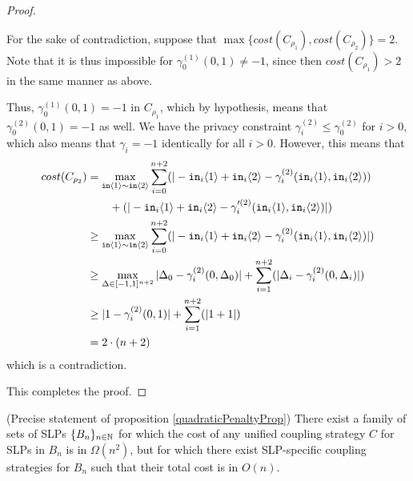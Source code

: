 \begin{proof}
\begin{itemize}
    For the sake of contradiction, suppose that $\max\{cost(C_{\rho_1}), cost(C_{\rho_2})\}=2$. Note that it is thus impossible for $\gamma_0^{(1)}(0, 1) \neq -1$, since then $cost(C_{\rho_1}) > 2$ in the same manner as above.  

    Thus, $\gamma_0^{(1)}(0, 1) = -1$ in $C_{\rho_1}$, which by hypothesis, means that $\gamma_0^{(2)}(0, 1) = -1$ as well. We have the privacy constraint $\gamma_i^{(2)} \leq \gamma_0^{(2)}$ for $i>0$, which also means that $\gamma_i = -1$ identically for all $i > 0$. However, this means that 
    \begin{align*}
        cost(C_{\rho_2}) &= \max_{\texttt{in}\langle1 \rangle\sim\texttt{in}\langle2 \rangle}\sum_{i=0}^{n+2}(|-\texttt{in}_i\langle1 \rangle+\texttt{in}_i\langle2 \rangle-\gamma_i^{(2)}(\texttt{in}_i\langle1 \rangle, \texttt{in}_i\langle2 \rangle))\\&\qquad+(|-\texttt{in}_i\langle1 \rangle+\texttt{in}_i\langle2 \rangle-\gamma_i^{\prime(2)}(\texttt{in}_i\langle1 \rangle, \texttt{in}_i\langle2 \rangle)|)\\
        &\geq \max_{\texttt{in}\langle1 \rangle\sim\texttt{in}\langle2 \rangle} \sum_{i=0}^{n+2}(|-\texttt{in}_i\langle1 \rangle+\texttt{in}_i\langle2 \rangle-\gamma_i^{(2)}(\texttt{in}_i\langle1 \rangle, \texttt{in}_i\langle2 \rangle)|)\\
        &\geq \max_{\Delta \in [-1, 1]^{n+2}} |\Delta_0 - \gamma_i^{(2)}(0, \Delta_0)| + \sum_{i=1}^{n+2}(|\Delta_i-\gamma_i^{(2)}(0, \Delta_i)|)\\
        &\geq |1 - \gamma_i^{(2)}(0, 1)| + \sum_{i=1}^{n+2}(|1+1|)\\
        &= 2 \cdot (n + 2)
    \end{align*}
    which is a contradiction. 

    \end{itemize}
    This completes the proof.     
\end{proof}

\begin{prop}(Precise statement of proposition \ref{quadraticPenaltyProp})
    There exist a family of sets of SLPs $\{B_n\}_{n\in \mathbb{N}}$ for which the cost of any unified coupling strategy $C$ for SLPs in $B_n$ is in $\Omega(n^2)$, but for which there exist SLP-specific coupling strategies for $B_n$ such that their total cost is in $O(n)$.
\end{prop}

